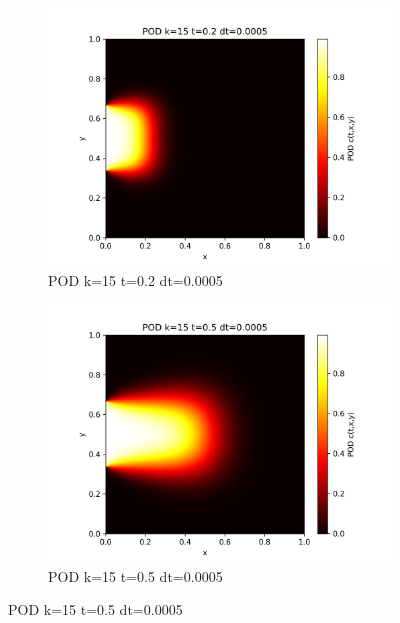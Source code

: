 \documentclass[11pt,a4 paper,one side]{article}
\begin{document}
\begin{figure}[htbp]
    \centering
    \begin{subfigure}{0.45\textwidth}
        \includegraphics[width=\textwidth]{POD k=15 t=0.2 dt=0.0005.png}
        \caption{POD k=15 t=0.2 dt=0.0005}
        \label{POD k=15 t=0.2 dt=0.0005}
    \end{subfigure}
    \hfill
    \begin{subfigure}{0.45\textwidth}
        \includegraphics[width=\textwidth]{POD k=15 t=0.5 dt=0.0005.png}
        \caption{POD k=15 t=0.5 dt=0.0005}
        \label{POD k=15 t=0.5 dt=0.0005}
    \end{subfigure}
    

\end{figure}
\end{document}
